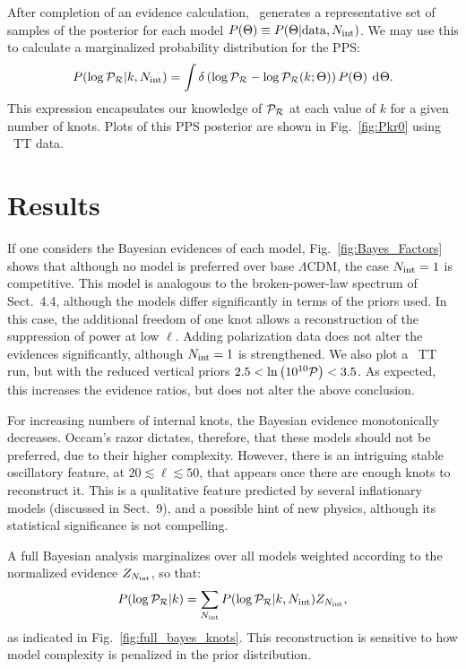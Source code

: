 After completion of an evidence calculation, \PolyChord\ generates a representative set of samples of the posterior for each model \(P(\Theta) \equiv P(\Theta|\mathrm{data},N_\mathrm{int})\). We may use this to calculate a marginalized probability distribution for the PPS\@:
\begin{equation}
  P(\log\mathcal{P}_\mathcal{R}|k,N_\mathrm{int}) = \int \delta\left(\log\mathcal{P}_\mathcal{R} - \log\mathcal{P}_\mathcal{R}(k;\Theta)\right)P(\Theta)\:\operatorname{d}^{}\!{\Theta}.
  \label{eqn:margPR}
\end{equation}
This expression encapsulates our knowledge of \(\mathcal{P}_\mathcal{R}\) at each value of \(k\) for a given number of knots.  Plots of this PPS posterior are shown in Fig.~\ref{fig:Pkr0} using \Planck\ TT data.


\section{Results}
If one considers the Bayesian evidences of each model, Fig.~\ref{fig:Bayes_Factors} shows that although no model is preferred over base \(\Lambda\)CDM, the case \(N_\mathrm{int}=1\) is competitive. This model is analogous to the broken-power-law spectrum of Sect.~4.4, although the models differ significantly in terms of the priors used. In this case, the additional freedom of one knot allows a reconstruction of the suppression of power at low \(\ell\). Adding polarization data does not alter the evidences significantly, although \(N_\mathrm{int}=1\) is strengthened. We also plot a \Planck\ TT run, but with the reduced vertical priors \({2.5<\ln\left(10^{10}\mathcal{P}\right)<3.5}\).  As expected, this increases the evidence ratios, but does not alter the above conclusion.

For increasing numbers of internal knots, the Bayesian evidence monotonically decreases. Occam's razor dictates, therefore, that these models should not be preferred, due to their higher complexity. However, there is an intriguing stable oscillatory feature, at \(20\lesssim\ell\lesssim50\), that appears once there are enough knots to reconstruct it.  This is a qualitative feature predicted by several inflationary models (discussed in Sect.~9), and a possible hint of new physics, although its statistical significance is not compelling.

A full Bayesian analysis marginalizes over all models weighted according to the normalized evidence \(Z_{N_\mathrm{int}}\), so that:
\begin{equation}
  P(\log\mathcal{P}_\mathcal{R}|k) = \sum\limits_{N_\mathrm{int}} P(\log\mathcal{P}_\mathcal{R}|k,N_\mathrm{int}) Z_{N_\mathrm{int}},
  \label{eqn:margPR_full}
\end{equation}
as indicated in Fig.~\ref{fig:full_bayes_knots}.  This reconstruction is sensitive to how model complexity is penalized in the prior distribution. 

